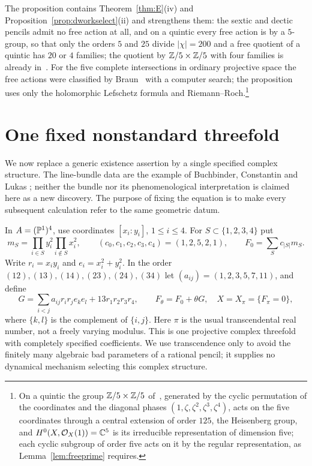 The proposition contains Theorem~\ref{thm:E}(iv) and
Proposition~\ref{prop:dworkselect}(ii) and strengthens them: the sextic and
dectic pencils admit no free action at all, and on a quintic every free
action is by a $5$-group, so that only the orders $5$ and $25$ divide
$|\chi|=200$ and a free quotient of a quintic has $20$ or $4$ families;
the quotient by $\mathbb{Z}/5\times\mathbb{Z}/5$ with four families is already
in~\cite{CHSW85}. For the five complete intersections in ordinary
projective space the free actions were classified by Braun~\cite{Bra11}
with a computer search; the proposition uses only the holomorphic
Lefschetz formula and Riemann--Roch.\footnote{On a quintic the group
$\mathbb{Z}/5\times\mathbb{Z}/5$ of~\cite{CHSW85}, generated by the cyclic permutation of
the coordinates and the diagonal phases $(1,\zeta,\zeta^2,\zeta^3,\zeta^4)$,
acts on the five coordinates through a central extension of order $125$,
the Heisenberg group, and $H^0(X,\mathcal{O}_X(1))=\mathbb{C}^5$ is its irreducible
representation of dimension five; each cyclic subgroup of order five acts on
it by the regular representation, as Lemma~\ref{lem:freeprime} requires.}



\section{One fixed nonstandard threefold}\label{sec:fixed}
We now replace a generic existence assertion by a single specified
complex structure. The line-bundle data are the example of Buchbinder,
Constantin and Lukas \cite[Section~5.1]{BCL}; neither the bundle nor its
phenomenological interpretation is claimed here as a new discovery.
The purpose of fixing the equation is to make every subsequent calculation
refer to the same geometric datum.

In $A=(\mathbb{P}^1)^4$, use coordinates $[x_i:y_i]$, $1\le i\le4$.
For $S\subset\{1,2,3,4\}$ put
\[
 m_S=\prod_{i\in S}y_i^2\prod_{i\notin S}x_i^2,
 \qquad (c_0,c_1,c_2,c_3,c_4)=(1,2,5,2,1),
 \qquad F_0=\sum_S c_{|S|}m_S.
\]
Write $r_i=x_i y_i$ and $e_i=x_i^2+y_i^2$. In the order
$(12),(13),(14),(23),(24),(34)$ let
$(a_{ij})=(1,2,3,5,7,11)$, and define
\begin{equation}\label{eq:fixedpencil}
 G=\sum_{i<j}a_{ij}r_i r_j e_k e_l+13r_1r_2r_3r_4,
 \qquad F_\theta=F_0+\theta G,
 \quad X=X_\pi=\{F_\pi=0\},
\end{equation}
where $\{k,l\}$ is the complement of $\{i,j\}$.
Here $\pi$ is the usual transcendental real number, not a freely varying
modulus. This is one projective complex threefold with completely specified
coefficients. We use transcendence only to avoid the finitely many
algebraic bad parameters of a rational pencil; it supplies no dynamical
mechanism selecting this complex structure.

